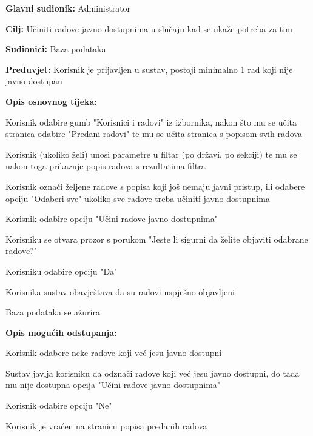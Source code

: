 					\begin{packed_item}
						
						\item \textbf{Glavni sudionik: } Administrator
						\item  \textbf{Cilj:} Učiniti radove javno dostupnima u slučaju kad se ukaže potreba za tim
						\item  \textbf{Sudionici:} Baza podataka
						\item  \textbf{Preduvjet:} Korisnik je prijavljen u sustav, postoji minimalno 1 rad koji nije javno dostupan
						\item  \textbf{Opis osnovnog tijeka:}
						
						\item[] \begin{packed_enum}
							\item Korisnik odabire gumb "Korisnici i radovi" iz izbornika, nakon što mu se učita stranica odabire "Predani radovi" te mu se učita stranica s popisom svih radova
							\item Korisnik (ukoliko želi) unosi parametre u filtar (po državi, po sekciji) te mu se nakon toga prikazuje popis radova s rezultatima filtra
							\item	 Korisnik označi željene radove s popisa koji još nemaju javni pristup, ili odabere opciju "Odaberi sve" ukoliko sve radove treba učiniti javno dostupnima
							\item Korisnik odabire opciju "Učini radove javno dostupnima"
							\item Korisniku se otvara prozor s porukom "Jeste li sigurni da želite objaviti odabrane radove?"
							\item Korisniku odabire opciju "Da"
							\item Korisnika sustav obavještava da su radovi uspješno objavljeni
							\item Baza podataka se ažurira
							
						\end{packed_enum}
					
						\item \textbf{Opis mogućih odstupanja:}
						\item[] \begin{packed_enum}
							\item[3.a] Korisnik odabere neke radove koji već jesu javno dostupni
							\item[] \begin{packed_enum}
								\item[1.] Sustav javlja korisniku da odznači radove koji već jesu javno dostupni, do tada mu nije dostupna opcija "Učini radove javno dostupnima"
							\end{packed_enum}
							\item[6.a] Korisnik odabire opciju "Ne"
							\item[] \begin{packed_enum}
								\item[1.] Korisnik je vraćen na stranicu popisa predanih radova
							\end{packed_enum} 
						\end{packed_enum}
						

\end{packed_item}
